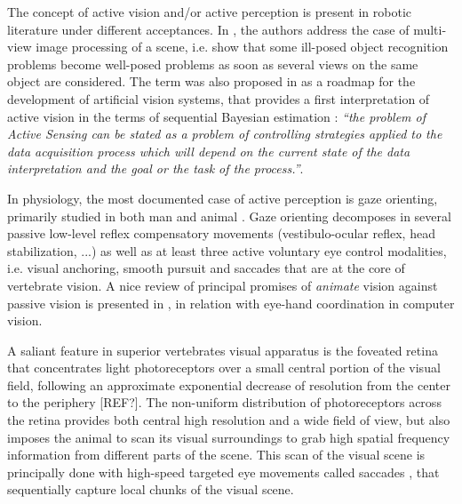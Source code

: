 \documentclass[12pt,twoside,openright]{article}
\begin{document}
	
	The concept of active vision and/or active perception is present in robotic literature under different acceptances. In \cite{aloimonos1988active}, the authors address the case of multi-view image processing of a scene, i.e. show that some ill-posed object recognition problems become well-posed problems as soon as several views on the  same object are considered. The term was also proposed in \cite{bajcsy1988active} as a roadmap for the development of artificial vision systems, that provides a first interpretation of active vision in the terms of sequential Bayesian estimation : \emph{{\color{blue} ``the problem  of Active Sensing can be stated as a problem of controlling strategies 
	applied to the data acquisition process which will depend on the current state 
	of the data interpretation and  the  goal  or the  task of  the  process.''}}.

	In physiology, the most documented case of active perception is gaze orienting, primarily studied in both man and animal \cite{yarbus1967eye,robinson1968eye}. Gaze orienting decomposes in several passive low-level reflex compensatory movements (vestibulo-ocular reflex, head stabilization, ...) as well as at least three active voluntary eye control modalities, i.e. visual anchoring, smooth pursuit and saccades that are at the core of vertebrate vision.  A nice review of principal promises of \emph{animate} vision against passive vision  is presented in \cite{ballard1991animate},  in relation with eye-hand coordination in computer vision.
	
	A saliant feature in superior vertebrates visual apparatus is the foveated retina that concentrates light photoreceptors over a small central portion of the visual field, {\color{magenta} following an approximate exponential decrease of resolution from the center to the periphery [REF?]}. The non-uniform distribution of photoreceptors across the retina provides both central high resolution and a wide field of view, but also imposes the animal to scan its visual surroundings to grab high spatial frequency information from different parts of the scene. This scan of the visual scene is principally done with high-speed targeted eye movements called saccades \cite{yarbus1967eye}, that sequentially capture local chunks of the visual scene. 
	
\end{document}
